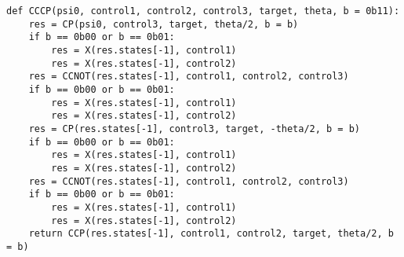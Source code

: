 \begin{verbatim}
def CCCP(psi0, control1, control2, control3, target, theta, b = 0b11):
    res = CP(psi0, control3, target, theta/2, b = b)
    if b == 0b00 or b == 0b01:
        res = X(res.states[-1], control1)
        res = X(res.states[-1], control2)
    res = CCNOT(res.states[-1], control1, control2, control3)
    if b == 0b00 or b == 0b01:
        res = X(res.states[-1], control1)
        res = X(res.states[-1], control2)
    res = CP(res.states[-1], control3, target, -theta/2, b = b)
    if b == 0b00 or b == 0b01:
        res = X(res.states[-1], control1)
        res = X(res.states[-1], control2)
    res = CCNOT(res.states[-1], control1, control2, control3)
    if b == 0b00 or b == 0b01:
        res = X(res.states[-1], control1)
        res = X(res.states[-1], control2)
    return CCP(res.states[-1], control1, control2, target, theta/2, b = b)

\end{verbatim}



